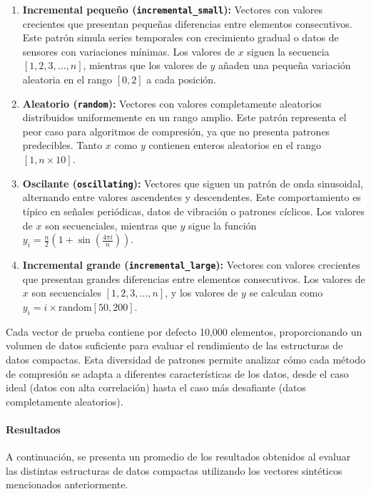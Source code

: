 \begin{enumerate}
    \item \textbf{Incremental pequeño (\texttt{incremental\_small}):} Vectores con valores crecientes que presentan pequeñas diferencias entre elementos consecutivos. Este patrón simula series temporales con crecimiento gradual o datos de sensores con variaciones mínimas. Los valores de $x$ siguen la secuencia $[1, 2, 3, ..., n]$, mientras que los valores de $y$ añaden una pequeña variación aleatoria en el rango $[0, 2]$ a cada posición.

    \item \textbf{Aleatorio (\texttt{random}):} Vectores con valores completamente aleatorios distribuidos uniformemente en un rango amplio. Este patrón representa el peor caso para algoritmos de compresión, ya que no presenta patrones predecibles. Tanto $x$ como $y$ contienen enteros aleatorios en el rango $[1, n \times 10]$.

    \item \textbf{Oscilante (\texttt{oscillating}):} Vectores que siguen un patrón de onda sinusoidal, alternando entre valores ascendentes y descendentes. Este comportamiento es típico en señales periódicas, datos de vibración o patrones cíclicos. Los valores de $x$ son secuenciales, mientras que $y$ sigue la función $y_i = \frac{n}{2}(1 + \sin(\frac{4\pi i}{n}))$.

    \item \textbf{Incremental grande (\texttt{incremental\_large}):} Vectores con valores crecientes que presentan grandes diferencias entre elementos consecutivos. Los valores de $x$ son secuenciales $[1, 2, 3, ..., n]$, y los valores de $y$ se calculan como $y_i = i \times \text{random}[50, 200]$.
\end{enumerate}

Cada vector de prueba contiene por defecto 10,000 elementos, proporcionando un volumen de datos suficiente para evaluar el rendimiento de las estructuras de datos compactas. Esta diversidad de patrones permite analizar cómo cada método de compresión se adapta a diferentes características de los datos, desde el caso ideal (datos con alta correlación) hasta el caso más desafiante (datos completamente aleatorios).

\paragraph{Resultados}
A continuación, se presenta un promedio de los resultados obtenidos al evaluar las distintas estructuras de datos compactas utilizando los vectores sintéticos mencionados anteriormente.

